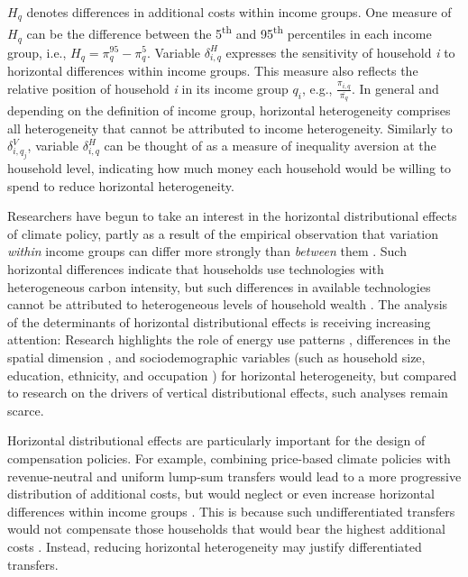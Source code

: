\documentclass[12pt, a4paper]{article}
\begin{document}
$H_{q}$ denotes differences in additional costs within income groups. One measure of $H_{q}$ can be the difference between the 5\textsuperscript{th} and 95\textsuperscript{th} percentiles in each income group, i.e., $H_{q}=\pi_{q}^{95}-\pi_{q}^{5}$. Variable $\delta_{i,q}^{H}$ expresses the sensitivity of household \textit{i} to horizontal differences within income groups. This measure also reflects the relative position of household \textit{i} in its income group $q_{i}$, e.g., $\frac{\pi_{i,q}}{\overline{\pi_{q}}}$. In general and depending on the definition of income group, horizontal heterogeneity comprises all heterogeneity that cannot be attributed to income heterogeneity. Similarly to $\delta_{i,q_{j}}^{V}$, variable $\delta_{i,q}^{H}$ can be thought of as a measure of inequality aversion at the household level, indicating how much money each household would be willing to spend to reduce horizontal heterogeneity.

Researchers have begun to take an interest in the horizontal distributional effects of climate policy, partly as a result of the empirical observation that variation \textit{within} income groups can differ more strongly than \textit{between} them \autocite{Cronin.2019,Steckel.2021b,Pizer.2019}. Such horizontal differences indicate that households use technologies with heterogeneous carbon intensity, but such differences in available technologies cannot be attributed to heterogeneous levels of household wealth \autocite{Hansel.2022}. The analysis of the determinants of horizontal distributional effects is receiving increasing attention: Research highlights the role of energy use patterns \autocite{Steckel.2021b,Missbach.2024}, differences in the spatial dimension \autocite{Chan.2023,Burtraw.2009}, and sociodemographic variables (such as household size, education, ethnicity, and occupation \autocite{Grainger.2010,Buchs.2013,Farrell.2017,Missbach.2023,Fremstad.2019}) for horizontal heterogeneity, but compared to research on the drivers of vertical distributional effects, such analyses remain scarce.

Horizontal distributional effects are particularly important for the design of compensation policies. For example, combining price-based climate policies with revenue-neutral and uniform lump-sum transfers would lead to a more progressive distribution of additional costs, but would neglect or even increase horizontal differences within income groups \autocite{Cronin.2019,Hansel.2022}. This is because such undifferentiated transfers would not compensate those households that would bear the highest additional costs \autocite{Fullerton.2019,Missbach.2024,Sallee.2019}. Instead, reducing horizontal heterogeneity may justify differentiated transfers.
\end{document}
